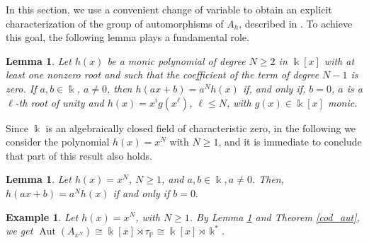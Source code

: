 \documentclass{article}
\numberwithin{equation}{section}\theoremstyle{plain}
\newtheorem{lemma}[theorem]{Lemma}
\newtheorem{example}[theorem]{Example}
\DeclareMathOperator{\Aut}{Aut}
\begin{document}
In this section, we use a convenient change of variable to obtain an explicit characterization of the group of automorphisms of $A_h$, described in \cite{BLO2015}.
To achieve this goal, the following lemma plays a fundamental role.

\begin{lemma}\label{lemma_caso_bzeroVeloso}\cite[Lem. 18]{BiaVeldan} Let $h(x)$ be a monic polynomial  of degree $N \geq 2$ in $\Bbbk[x]$  with at least one nonzero root and such that the coefficient of the term of degree $N-1$ is zero. If $a,b\in \Bbbk$, $a\neq 0$,  then $h(ax+b)=a^N h(x)$ if, and only if, $b=0$, $a$ is a $\ell$-th root of unity and $h(x)=x^i g(x^\ell)$, $\ell \leq N$, with $g(x)\in \Bbbk[x]$ monic.
\end{lemma}

Since $\Bbbk$ is an algebraically closed field of characteristic zero, in the following we consider the polynomial $h(x) = x^N$ with $N\geq 1$, and it is immediate to conclude that part of this result also holds.


\begin{lemma}\label{lema_xN_bzero}
   Let $h(x)=x^N$, $N \geq 1$, and $a, b \in \Bbbk, a \neq 0$.
    Then, $h(ax+b) = a^N h(x)$ if and only if $b=0.$
\end{lemma}

\medbreak

\begin{example}
    Let $h(x)=x^N$, with $N \geq 1$.
    By Lemma \ref{lema_xN_bzero} and Theorem \ref{cod_aut}, we get $\Aut(A_{x^N}) \cong \Bbbk[x]\rtimes \tau_{\mathbb{P}} \cong \Bbbk[x]\rtimes \Bbbk^*$.
\end{example}
\end{document}
